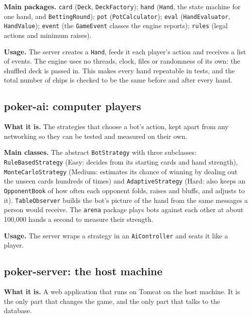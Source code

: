 \documentclass[12pt,a4paper]{article}
\newcommand{\cls}[1]{\texttt{#1}}
\begin{document}
\textbf{Main packages.} \cls{card} (\cls{Deck}, \cls{DeckFactory}); \cls{hand} (\cls{Hand}, the
state machine for one hand, and \cls{BettingRound}); \cls{pot} (\cls{PotCalculator}); \cls{eval}
(\cls{HandEvaluator}, \cls{HandValue}); \cls{event} (the \cls{GameEvent} classes the engine
reports); \cls{rules} (legal actions and minimum raises).

\textbf{Usage.} The server creates a \cls{Hand}, feeds it each player's action and receives a
list of events. The engine uses no threads, clock, files or randomness of its own: the shuffled
deck is passed in. This makes every hand repeatable in tests, and the total number of chips is
checked to be the same before and after every hand.

\subsection{poker-ai: computer players}
\textbf{What it is.} The strategies that choose a bot's action, kept apart from any networking
so they can be tested and measured on their own.

\textbf{Main classes.} The abstract \cls{BotStrategy} with three subclasses:
\cls{RuleBasedStrategy} (Easy: decides from its starting cards and hand strength),
\cls{MonteCarloStrategy} (Medium: estimates its chance of winning by dealing out the unseen
cards hundreds of times) and \cls{AdaptiveStrategy} (Hard: also keeps an \cls{OpponentBook} of
how often each opponent folds, raises and bluffs, and adjusts to it). \cls{TableObserver} builds
the bot's picture of the hand from the same messages a person would receive. The \cls{arena}
package plays bots against each other at about 100,000 hands a second to measure their
strength.

\textbf{Usage.} The server wraps a strategy in an \cls{AiController} and seats it like a player.

\subsection{poker-server: the host machine}
\textbf{What it is.} A web application that runs on Tomcat on the host machine. It is the only
part that changes the game, and the only part that talks to the database.
\end{document}
